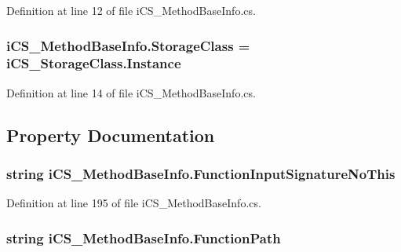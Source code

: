 Definition at line 12 of file i\+C\+S\+\_\+\+Method\+Base\+Info.\+cs.

\hypertarget{classi_c_s___method_base_info_a4768afb99d42238e49309900a4853665}{
\subsubsection[{Storage\+Class}]{ i\+C\+S\+\_\+\+Method\+Base\+Info.\+Storage\+Class = {\bf i\+C\+S\+\_\+\+Storage\+Class.\+Instance}}}\label{classi_c_s___method_base_info_a4768afb99d42238e49309900a4853665}


Definition at line 14 of file i\+C\+S\+\_\+\+Method\+Base\+Info.\+cs.



\subsection{Property Documentation}
\hypertarget{classi_c_s___method_base_info_a3db874977d8e777ba73846aef565761a}{
\subsubsection[{Function\+Input\+Signature\+No\+This}]{\setlength{\rightskip}{0pt plus 5cm}string i\+C\+S\+\_\+\+Method\+Base\+Info.\+Function\+Input\+Signature\+No\+This\hspace{0.3cm}{\ttfamily [get]}}}\label{classi_c_s___method_base_info_a3db874977d8e777ba73846aef565761a}


Definition at line 195 of file i\+C\+S\+\_\+\+Method\+Base\+Info.\+cs.

\hypertarget{classi_c_s___method_base_info_a38202bc792d862412188ebc960cb4f6a}{
\subsubsection[{Function\+Path}]{\setlength{\rightskip}{0pt plus 5cm}string i\+C\+S\+\_\+\+Method\+Base\+Info.\+Function\+Path\hspace{0.3cm}{\ttfamily [get]}}}\label{classi_c_s___method_base_info_a38202bc792d862412188ebc960cb4f6a}


